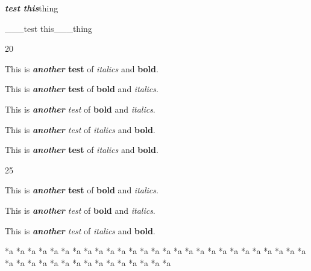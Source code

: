 \textbf{\emph{test this}}thing

\_\_\_test this\_\_\_thing

20

This is \textbf{\emph{another} test} of \emph{italics} and \textbf{bold}.

This is \textbf{\emph{another} test} of \textbf{bold} and \emph{italics}.

This is \emph{\textbf{another} test} of \textbf{bold} and \emph{italics}.

This is \emph{\textbf{another} test} of \emph{italics} and \textbf{bold}.

This is \textbf{\emph{another} test} of \emph{italics} and \textbf{bold}.

25

This is \textbf{\emph{another} test} of \textbf{bold} and \emph{italics}.

This is \emph{\textbf{another} test} of \textbf{bold} and \emph{italics}.

This is \emph{\textbf{another} test} of \emph{italics} and \textbf{bold}.

*a *a *a *a *a *a *a *a *a *a *a *a *a *a *a *a *a *a *a *a *a *a *a *a *a *a *a *a *a *a *a *a *a *a *a *a *a *a *a *a *a *a
